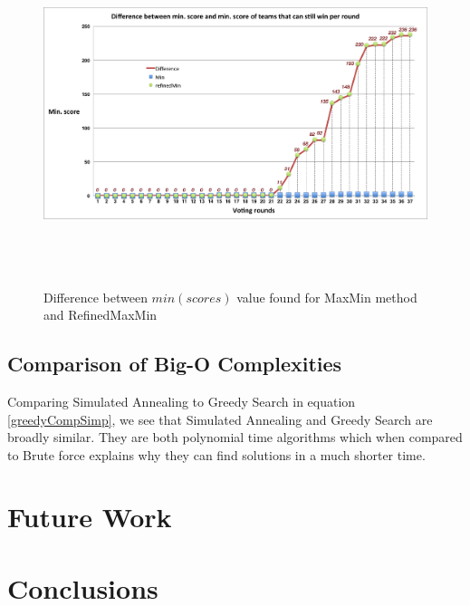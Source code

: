 \documentclass[12pt]{report}
\begin{document}
\begin{figure}[H]
\centering
\includegraphics[width=17cm, height=10cm]{../code/misc/difference_MinvsRefinedMin}
\caption{Difference between $min(scores)$ value found for MaxMin method and RefinedMaxMin}
\label{f_maxminDif}
\end{figure}


\subsection{Comparison of Big-O Complexities}
Comparing Simulated Annealing to Greedy Search in equation \ref{greedyCompSimp}, we see that Simulated Annealing and Greedy Search are broadly similar. They are both polynomial time algorithms which when compared to Brute force explains why they can find solutions in a much shorter time. 


\section{Future Work}\label{FutureWork}


\section{Conclusions}\label{Conclusions}
\end{document}
